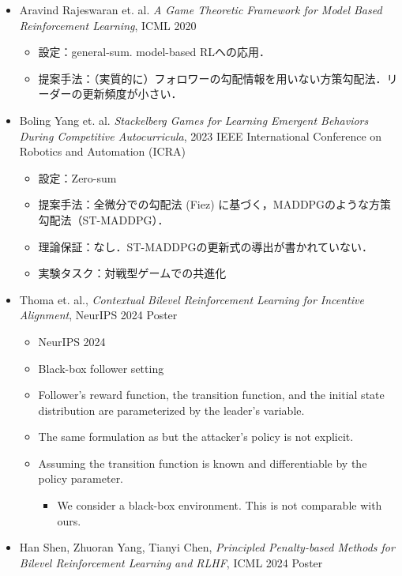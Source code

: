 \documentclass[a4paper,10pt,dvipdfmx]{jsarticle}
\begin{document}
\begin{itemize}
    \item Aravind Rajeswaran et. al. \textit{A Game Theoretic Framework for Model Based Reinforcement Learning}, ICML 2020\cite{Rajeswaran-ym}
    \begin{itemize}
        \item 設定：general-sum. model-based RLへの応用．
        \item 提案手法：（実質的に）フォロワーの勾配情報を用いない方策勾配法．リーダーの更新頻度が小さい．
    \end{itemize}
    \item Boling Yang et. al. \textit{Stackelberg Games for Learning Emergent Behaviors During Competitive Autocurricula}, 2023 IEEE International Conference on Robotics and Automation (ICRA)\cite{Yang2023-tf}
    \begin{itemize}
        \item 設定：Zero-sum
        \item 提案手法：全微分での勾配法 (Fiez\cite{Fiez2020-lu}) に基づく，MADDPGのような方策勾配法（ST-MADDPG）．
        \item 理論保証：なし．ST-MADDPGの更新式の導出が書かれていない．
        \item 実験タスク：対戦型ゲームでの共進化
    \end{itemize}
    \item Thoma et. al., \textit{Contextual Bilevel Reinforcement Learning for Incentive Alignment}, NeurIPS 2024 Poster\cite{Thoma2024-em}
    \begin{itemize}
        \item NeurIPS 2024
        \item Black-box follower setting
        \item Follower's reward function, the transition function, and the initial state distribution are parameterized by the leader's variable.
        \item The same formulation as  but the attacker's policy is not explicit.
        \item Assuming the transition function is known and differentiable by the policy parameter.
        \begin{itemize}
            \item[$\to$] We consider a black-box environment. This is not comparable with ours.
        \end{itemize}
    \end{itemize}
    \item Han Shen, Zhuoran Yang, Tianyi Chen, \textit{Principled Penalty-based Methods for Bilevel Reinforcement Learning and RLHF}, ICML 2024 Poster\cite{shen2024principled}

\end{itemize}
\end{document}
